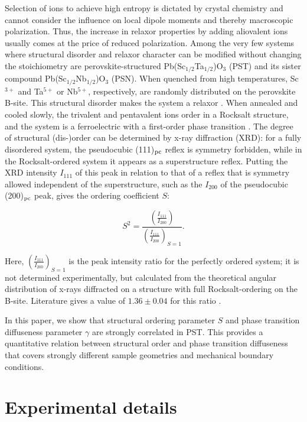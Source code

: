\documentclass[%
 preprint, %
 amsmath,amssymb,
 aps, physrev,
]{revtex4-2}
\begin{document}
Selection of ions to achieve high entropy is dictated by crystal chemistry and cannot consider the influence on local dipole moments and thereby macroscopic polarization. Thus, the increase in relaxor properties by adding aliovalent ions usually comes at the price of reduced polarization. Among the very few systems where structural disorder and relaxor character can be modified without changing the stoichiometry are perovskite-structured Pb(Sc$_{1/2}$Ta$_{1/2}$)O$_3$ (PST) and its sister compound Pb(Sc$_{1/2}$Nb$_{1/2}$)O$_3$ (PSN). When quenched from high temperatures, Sc$^{3+}$ and Ta$^{5+}$ or Nb$^{5+}$, respectively, are randomly distributed on the perovskite B-site. This structural disorder makes the system a relaxor \cite{Stenger79}. When annealed and cooled slowly, the trivalent and pentavalent ions order in a Rocksalt structure, and the system is a ferroelectric with a first-order phase transition \cite{Stenger79}. The degree of structural (dis-)order can be determined by x-ray diffraction (XRD): for a fully disordered system, the pseudocubic (111)$_{\rm pc}$ reflex is symmetry forbidden, while in the Rocksalt-ordered system it appears as a superstructure reflex. Putting the XRD intensity $I_{111}$ of this peak in relation to that of a reflex that is symmetry allowed independent of the superstructure, such as the $I_{200}$ of the pseudocubic (200)$_{\rm pc}$ peak, gives the ordering coefficient $S$:

\begin{equation}
    S^2 = \frac{\left(\frac{I_{111}}{I_{200}}\right)}{\left(\frac{I_{111}}{I_{200}}\right)_{S=1}}.
    \label{Orderingeq}
\end{equation}

Here, $\left(\frac{I_{111}}{I_{200}}\right)_{S=1}$ is the peak intensity ratio for the perfectly ordered system; it is not determined experimentally, but calculated from the theoretical angular distribution of x-rays diffracted on a structure with full Rocksalt-ordering on the B-site. Literature gives a value of $1.36\pm0.04$ for this ratio \cite{Pietraszko04,Shebanov88}.

In this paper, we show that structural ordering parameter $S$ and phase transition diffuseness parameter $\gamma$ are strongly correlated in PST. This provides a quantitative relation between structural order and phase transition diffuseness that covers strongly different sample geometries and mechanical boundary conditions.

\section{Experimental details}
\end{document}
